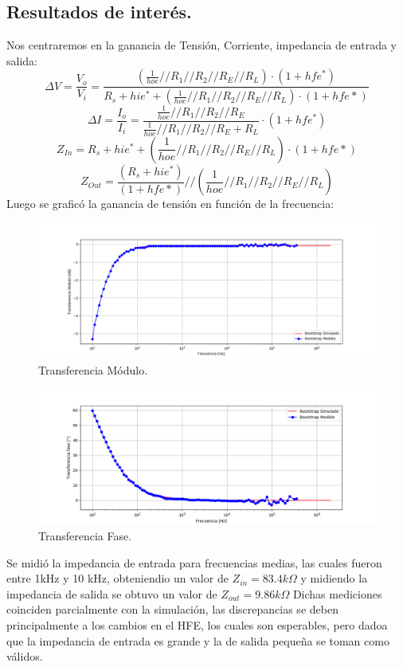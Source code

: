 \documentclass[a4paper]{article}
\begin{document}
\subsection{Resultados de interés.}
Nos centraremos en la ganancia de Tensión, Corriente, impedancia de entrada y salida:
\begin{equation} \Delta V = \frac{V_o}{V_i} = \frac{ \left(\frac{1}{hoe} // R_1 // R_2 // R_E // R_L  \right)\cdot (1+hfe^*)}{R_s + hie^* + \left(\frac{1}{hoe} // R_1 // R_2 // R_E // R_L  \right)\cdot (1+hfe*) } 
\end{equation}
\begin{equation} \Delta I = \frac{I_o}{I_i} =  \frac{\frac{1}{hoe} // R_1 // R_2 // R_E}{\frac{1}{hoe} // R_1 // R_2 // R_E+R_L} \cdot (1+hfe^*)
\end{equation}
\begin{equation} Z_{In} = R_s + hie^* + \left(\frac{1}{hoe} // R_1 // R_2 // R_E // R_L  \right)\cdot (1+hfe*)\end{equation}
\begin{equation} Z_{Out} = \frac{(R_s + hie^*)}{(1+hfe*)} //  \left(\frac{1}{hoe} // R_1 // R_2 // R_E // R_L  \right)\end{equation}
Luego se graficó la ganancia de tensión en función de la frecuencia:
\begin{figure} [H]
	\centering
	\includegraphics[width=\textwidth]{imagenes/avs.png}
	\caption{Transferencia Módulo.}
	\label{fig:transmod}
\end{figure}
\begin{figure} [H]
	\centering
	\includegraphics[width=\textwidth]{imagenes/avsp.png}
	\caption{Transferencia Fase.}
	\label{fig:transph}
\end{figure}
Se midió la impedancia de entrada para frecuencias medias, las cuales fueron entre 1kHz y 10 kHz, obteniendio un valor de $Z_{in}=83.4k\Omega$ y midiendo la impedancia de salida se obtuvo un valor de $Z_{out} = 9.86 k \Omega $
Dichas mediciones coinciden parcialmente con la simulación, las discrepancias se deben principalmente a los cambios en el HFE, los cuales son esperables, pero dadoa  que la impedancia de entrada es grande y la de salida pequeña se toman como válidos.
\end{document}
